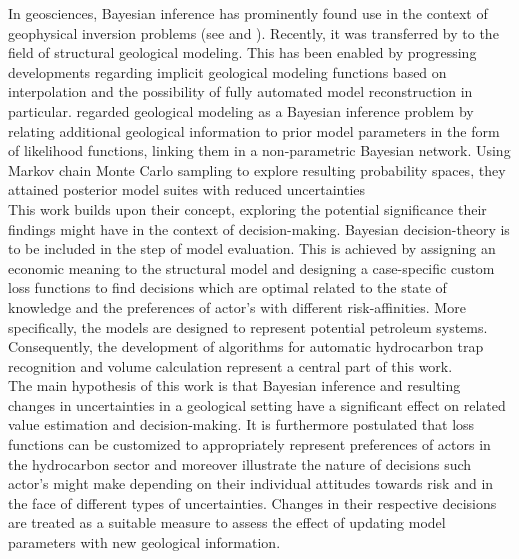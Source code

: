 In geosciences, Bayesian inference has prominently found use in the context of geophysical inversion problems (see \citet{tarantola1982inverse, mosegaard2002probabilistic} and \citet{sambridge2002monte}). Recently, it was transferred by \citet{delaVarga2016} to the field of structural geological modeling. This has been enabled by progressing developments regarding implicit geological modeling functions based on interpolation \citep{hillier2014three, mallet1992discrete, lajaunie1997foliation} and the possibility of fully automated model reconstruction in particular.  \citet{delaVarga2016} regarded geological modeling as a Bayesian inference problem by relating additional geological information to prior model parameters in the form of likelihood functions, linking them in a non-parametric Bayesian network. Using Markov chain Monte Carlo sampling to explore resulting probability spaces, they attained posterior model suites with reduced uncertainties \citep{delaVarga2016}\\
This work builds upon their concept, exploring the potential significance their findings might have in the context of decision-making. Bayesian decision-theory is to be included in the step of model evaluation. This is achieved by assigning an economic meaning to the structural model and designing a case-specific custom loss functions to find decisions which are optimal related to the state of knowledge and the preferences of actor's with different risk-affinities. More specifically, the models are designed to represent potential petroleum systems. Consequently, the development of algorithms for automatic hydrocarbon trap recognition and volume calculation represent a central part of this work.\\
The main hypothesis of this work is that Bayesian inference and resulting changes in uncertainties in a geological setting have a significant effect on related value estimation and decision-making. It is furthermore postulated that loss functions can be customized to appropriately represent preferences of actors in the hydrocarbon sector and moreover illustrate the nature of decisions such actor's might make depending on their individual attitudes towards risk and in the face of different types of uncertainties. Changes in their respective decisions are treated as a suitable measure to assess the effect of updating model parameters with new geological information.
